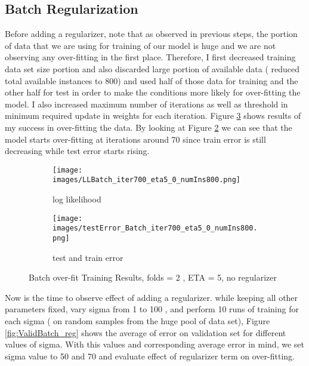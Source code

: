 \documentclass[a4paper,11pt]{article}
\begin{document}
\subsection*{Batch Regularization}
Before adding a regularizer, note that as observed in previous steps, the portion of data that we are using for training of our model is huge and we are not observing any over-fitting in the first place. Therefore, I first decreased training data set size portion and also discarded large portion of available data ( reduced total available instances to 800) and used half of those data for training and the other half for test in order to make the conditions more likely for over-fitting the model. I also increased maximum number of iterations as well as threshold in minimum required update in weights for each iteration. Figure \ref{fig:Batch_overfit} shows results of my success in over-fitting the data. By looking at Figure \ref{fig:Batch_overfit error} we can see that the model starts over-fitting at iterations around 70 since train error is still decreasing while test error starts rising.  
\begin{figure}[t]

\begin{subfigure}{.5\textwidth}

  \texttt{[image: images/LLBatch\_iter700\_eta5\_0\_numIns800.png]}
	\centering
  \caption{log likelihood }
  \label{fig:LLBatch_overfit}
\end{subfigure}
\begin{subfigure}{.5\textwidth}

  \texttt{[image: images/testError\_Batch\_iter700\_eta5\_0\_numIns800.png]}
	\centering
  \caption{test and train error }
  \label{fig:Batch_overfit error}
\end{subfigure}

  \caption{Batch over-fit Training Results, folds = 2 , ETA = 5, no regularizer}
  \label{fig:Batch_overfit}
\end{figure}
 Now is the time to observe effect of adding a regularizer. while keeping all other parameters fixed, vary sigma from 1 to 100 , and perform 10 runs of training for each sigma ( on random samples from the huge pool of data set), Figure \ref{fig:ValidBatch_reg} shows the average of error on validation set for different values of sigma. With this values and corresponding average error in mind, we set sigma value to 50 and 70 and evaluate effect of regularizer term on over-fitting.  
\end{document}
